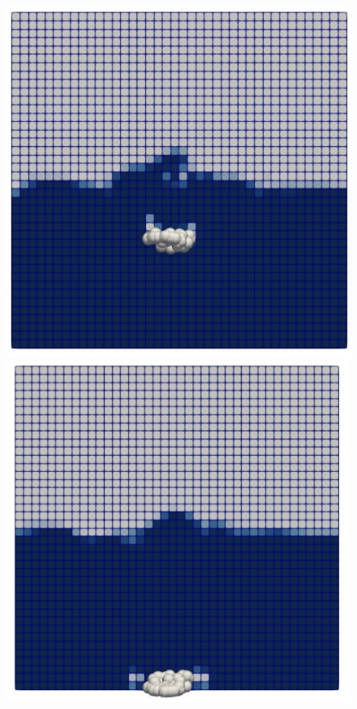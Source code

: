 \begin{figure}[H]
\begin{minipage}{.5\textwidth}
        \includegraphics[width=\linewidth]{GWU_Thesis_Sarmakeeva/Images/chap4/clump_2.png}
    \end{minipage}
    \newline
    \begin{minipage}{.5\textwidth}
        \centering
        \includegraphics[width=\linewidth]{GWU_Thesis_Sarmakeeva/Images/chap4/clump_3.png}

\end{minipage}
\end{figure}
